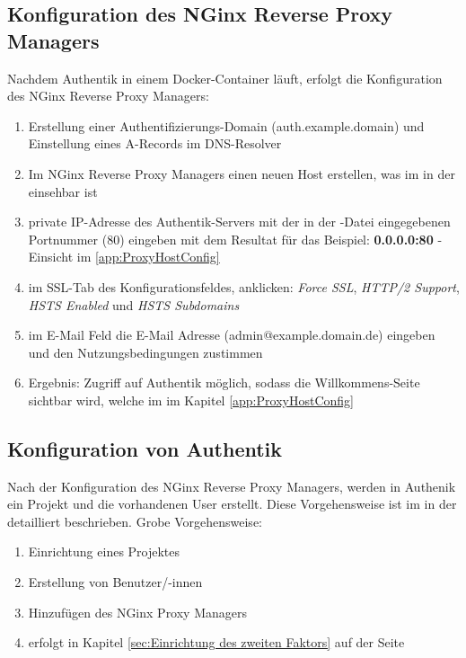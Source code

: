 \subsection{Konfiguration des NGinx Reverse Proxy Managers}
\label{sec:Konfiguration des NGinx Reverse Proxy Managers}
Nachdem Authentik in einem Docker-Container läuft, erfolgt die Konfiguration des NGinx Reverse Proxy Managers:
\begin{enumerate}[label=\arabic*.]
    \item Erstellung einer Authentifizierungs-Domain (auth.example.domain) und Einstellung eines A-Records im DNS-Resolver
    \item Im NGinx Reverse Proxy Managers einen neuen Host erstellen, was im  in der  einsehbar ist
    \item private IP-Adresse des Authentik-Servers mit der in der \textbf{}-Datei eingegebenen Portnummer (80) eingeben 
    mit dem Resultat für das Beispiel: \textbf{0.0.0.0:80} - Einsicht im \ref{app:ProxyHostConfig} 
    \item im SSL-Tab des Konfigurationsfeldes, anklicken: \textit{Force SSL}, \textit{HTTP/2 Support}, \textit{HSTS Enabled} und \textit{HSTS Subdomains}
    \item im E-Mail Feld die E-Mail Adresse (admin@example.domain.de) eingeben und den Nutzungsbedingungen zustimmen
    \item Ergebnis: Zugriff auf Authentik möglich, sodass die Willkommens-Seite sichtbar wird, welche im  im Kapitel 
    \ref{app:ProxyHostConfig} 
\end{enumerate}

\subsection{Konfiguration von Authentik}
\label{sec: Konfiguration von Authentik}
Nach der Konfiguration des NGinx Reverse Proxy Managers, werden in Authenik ein Projekt und die vorhandenen User erstellt. Diese Vorgehensweise 
ist im  in der  detailliert beschrieben.
Grobe Vorgehensweise:
\begin{enumerate}
    \item Einrichtung eines Projektes
    \item Erstellung von Benutzer/-innen
    \item Hinzufügen des NGinx Proxy Managers
    \item {} erfolgt in Kapitel \ref*{sec:Einrichtung des zweiten Faktors} auf der 
    Seite \pageref{sec:Einrichtung des zweiten Faktors}
\end{enumerate}


